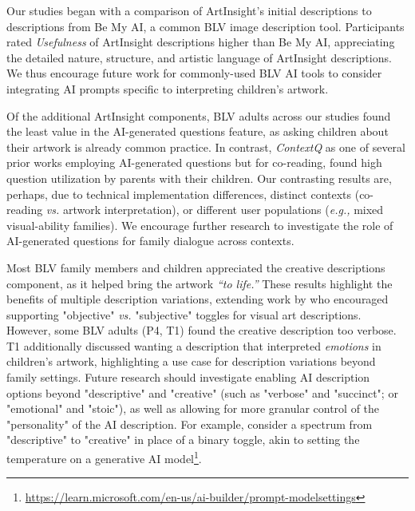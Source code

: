 \documentclass[sigconf]{acmart}
\begin{document}
Our studies began with a comparison of ArtInsight's initial descriptions to descriptions from Be My AI, a common BLV image description tool. Participants rated \textit{Usefulness} of ArtInsight descriptions higher than Be My AI, appreciating the detailed nature, structure, and artistic language of ArtInsight descriptions. We thus encourage future work for commonly-used BLV AI tools \cite{be_my_ai_2024, seeing_ai} to consider integrating AI prompts specific to interpreting children's artwork.

Of the additional ArtInsight components, BLV adults across our studies found the least value in the AI-generated questions feature, as asking children about their artwork is already common practice. In contrast, \textit{ContextQ} \cite{Dietz_ContextQ} as one of several prior works \cite{Zhang_StoryBuddy, Lin_FishScales} employing AI-generated questions but for co-reading, found high question utilization by parents with their children. Our contrasting results are, perhaps, due to technical implementation differences, distinct contexts (co-reading \textit{vs.} artwork interpretation), or different user populations (\textit{e.g.,} mixed visual-ability families). We encourage further research to investigate the role of AI-generated questions for family dialogue across contexts.

Most BLV family members and children appreciated the creative descriptions component, as it helped bring the artwork \textit{``to life.''} These results highlight the benefits of multiple description variations, extending work by \citet{Li_UnderstandingVisualArtsExperiences} who encouraged supporting "objective" \textit{vs.} "subjective" toggles for visual art descriptions. However, some BLV adults (P4, T1) found the creative description too verbose. T1 additionally discussed wanting a description that interpreted \textit{emotions} in children's artwork, highlighting a use case for description variations beyond family settings. Future research should investigate enabling AI description options beyond "descriptive" and "creative" (such as "verbose" and "succinct"; or "emotional" and "stoic"), as well as allowing for more granular control of the "personality" of the AI description. For example, consider a spectrum from "descriptive" to "creative" in place of a binary toggle, akin to setting the temperature on a generative AI model\footnote{\href{https://learn.microsoft.com/en-us/ai-builder/prompt-modelsettings}{https://learn.microsoft.com/en-us/ai-builder/prompt-modelsettings}}.
\end{document}
